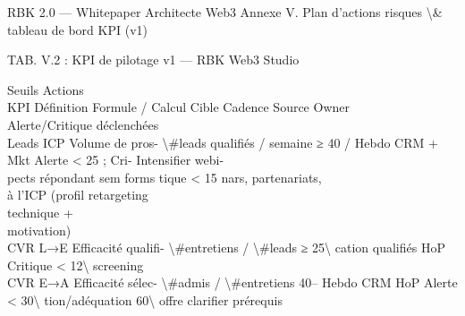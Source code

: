 \documentclass[12pt,landscape,a4paper]{article}
\begin{document}
RBK 2.0 — Whitepaper Architecte Web3                                                                      Annexe V. Plan d’actions risques \textbackslash{}& tableau de bord KPI (v1)\\
\vspace{0.5em}
\vspace{0.5em}
\begin{center}\begin{tabular}TAB. V.2 : KPI de pilotage v1 — RBK Web3 Studio\end{tabular}\end{center}
Seuils                Actions\\
KPI            Définition         Formule / Calcul             Cible   Cadence   Source     Owner\\
Alerte/Critique       déclenchées\\
Leads ICP      Volume de pros- \textbackslash{}#leads qualifiés / semaine ≥ 40 / Hebdo           CRM +      Mkt       Alerte \textless{} 25 ; Cri-    Intensifier webi-\\
pects répondant                            sem                    forms                tique \textless{} 15            nars, partenariats,\\
à l’ICP (profil                                                                                              retargeting\\
technique +\\
motivation)\\
CVR L→E        Efficacité qualifi- \textbackslash{}#entretiens / \textbackslash{}#leads   ≥ 25\textbackslash{}%
cation              qualifiés                                                HoP       Critique \textless{} 12\textbackslash{}%
screening\\
CVR E→A        Efficacité sélec- \textbackslash{}#admis / \textbackslash{}#entretiens          40–     Hebdo     CRM        HoP       Alerte \textless{} 30\textbackslash{}%
tion/adéquation                                 60\textbackslash{}%
offre                                                                                                        clarifier prérequis\\
\end{document}
